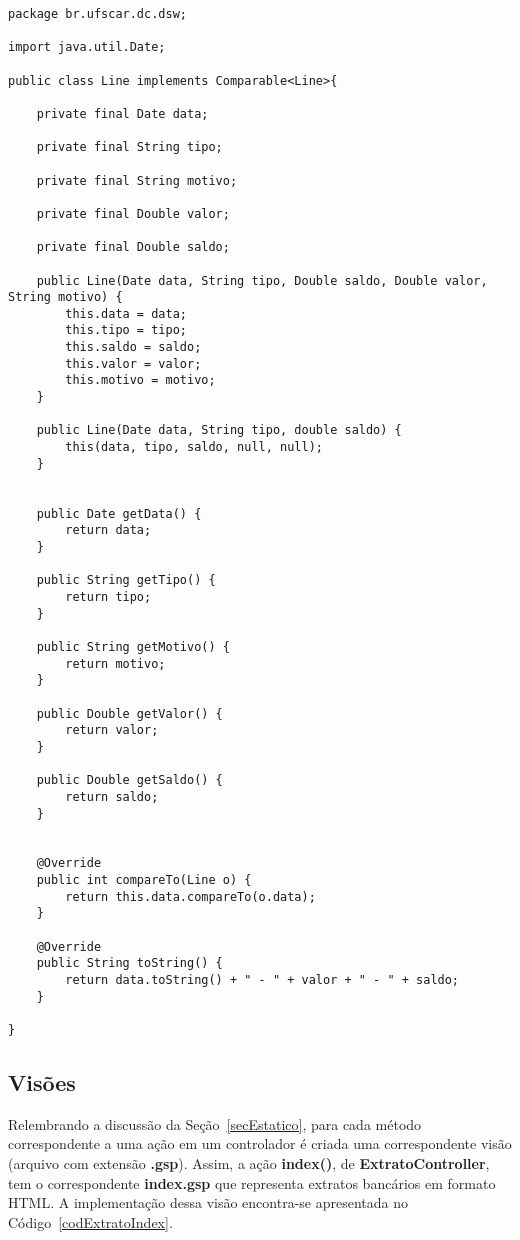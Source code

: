 \begin{lstlisting}[caption=Classe  Java   {\bf  Line},  frame=trBL,  float=htbp,
    label=codLine] 
package br.ufscar.dc.dsw;

import java.util.Date;

public class Line implements Comparable<Line>{
    
    private final Date data;
    
    private final String tipo;
    
    private final String motivo;
    
    private final Double valor;
    
    private final Double saldo;

    public Line(Date data, String tipo, Double saldo, Double valor, String motivo) {
        this.data = data;
        this.tipo = tipo;
        this.saldo = saldo;
        this.valor = valor;
        this.motivo = motivo;
    }
    
    public Line(Date data, String tipo, double saldo) {
        this(data, tipo, saldo, null, null);
    }
    

    public Date getData() {
        return data;
    }

    public String getTipo() {
        return tipo;
    }

    public String getMotivo() {
        return motivo;
    }

    public Double getValor() {
        return valor;
    }

    public Double getSaldo() {
        return saldo;
    }    

    
    @Override
    public int compareTo(Line o) {
        return this.data.compareTo(o.data);
    }

    @Override
    public String toString() {
        return data.toString() + " - " + valor + " - " + saldo;
    }
    
}
\end{lstlisting}

\newpage

\subsection{Visões}\label{secExtratoVisoes}

\vspace{0.5cm}

Relembrando   a   discussão  da   Seção~\ref{secEstatico},   para  cada   método
correspondente a  uma ação em um  controlador é criada  uma correspondente visão
(arquivo  com  extensão {\bf  .gsp}).   Assim, a  ação  {\bf  index()}, de  {\bf
  ExtratoController},  tem  o  correspondente  {\bf  index.gsp}  que  representa
extratos  bancários em  formato HTML.  A implementação  dessa  visão encontra-se
apresentada no Código~\ref{codExtratoIndex}.

